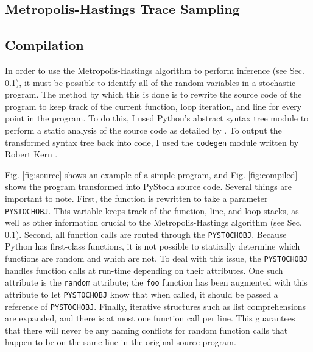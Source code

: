 \documentclass[12pt,letterpaper]{article}
\begin{document}
\subsection{Metropolis-Hastings Trace Sampling}
\label{sec:mh}

\subsection{Compilation}
\label{sec:compilation}

In order to use the Metropolis-Hastings algorithm to perform inference
(see Sec. \ref{sec:mh}), it must be possible to identify all of the
random variables in a stochastic program.  The method by which this is
done is to rewrite the source code of the program to keep track of the
current function, loop iteration, and line for every point in the
program.  To do this, I used Python's abstract syntax tree module
\cite{ast} to perform a static analysis of the source code as detailed
by .  To output the transformed syntax tree back
into code, I used the \texttt{codegen} module written by Robert Kern
\cite{codegen}.  

Fig. \ref{fig:source} shows an example of a simple program, and
Fig. \ref{fig:compiled} shows the program transformed into PyStoch
source code.  Several things are important to note.  First, the
function is rewritten to take a parameter \texttt{PYSTOCHOBJ}.  This
variable keeps track of the function, line, and loop stacks, as well
as other information crucial to the Metropolis-Hastings algorithm (see
Sec. \ref{sec:mh}).  Second, all function calls are routed through the
\texttt{PYSTOCHOBJ}.  Because Python has first-class functions, it is
not possible to statically determine which functions are random and
which are not.  To deal with this issue, the \texttt{PYSTOCHOBJ}
handles function calls at run-time depending on their attributes.  One
such attribute is the \texttt{random} attribute; the \texttt{foo}
function has been augmented with this attribute to let
\texttt{PYSTOCHOBJ} know that when called, it should be passed a
reference of \texttt{PYSTOCHOBJ}.  Finally, iterative structures such
as list comprehensions are expanded, and there is at most one function
call per line.  This guarantees that there will never be any naming
conflicts for random function calls that happen to be on the same line
in the original source program.
\end{document}
